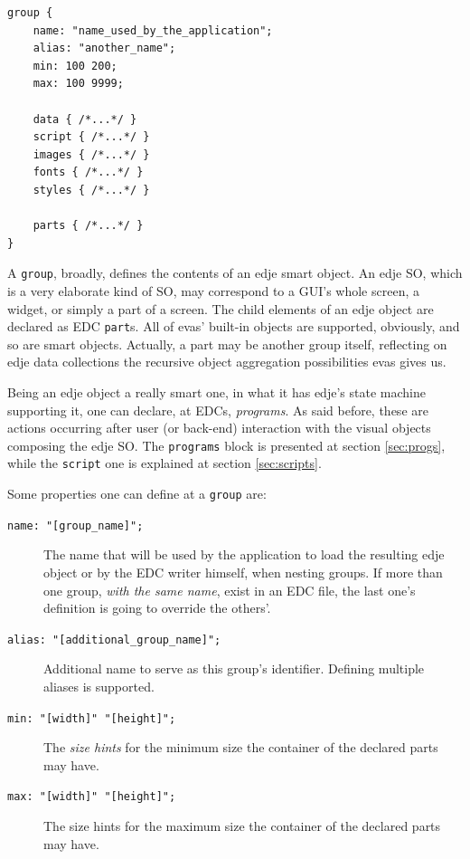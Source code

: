 \documentclass[a4paper]{profusion}
\begin{document}

\begin{lstlisting}
group {
    name: "name_used_by_the_application";
    alias: "another_name";
    min: 100 200;
    max: 100 9999;

    data { /*...*/ }
    script { /*...*/ }
    images { /*...*/ }
    fonts { /*...*/ }
    styles { /*...*/ }

    parts { /*...*/ }
}
\end{lstlisting}

A \texttt{group}, broadly, defines the contents of an edje smart
object.  An edje SO, which is a very elaborate kind of SO, may
correspond to a GUI's whole screen, a widget, or simply a part of a
screen.  The child elements of an edje object are declared as EDC
\texttt{part}s.  All of evas' built-in objects are supported,
obviously, and so are smart objects. Actually, a part may be another
group itself, reflecting on edje data collections the recursive object
aggregation possibilities evas gives us.

Being an edje object a really smart one, in what it has edje's state
machine supporting it, one can declare, at EDCs, \emph{programs}. As
said before, these are actions occurring after user (or back-end)
interaction with the visual objects composing the edje SO. The
\texttt{programs} block is presented at section \ref{sec:progs}, while
the \texttt{script} one is explained at section \ref{sec:scripts}.

Some properties one can define at a \texttt{group} are:

\begin{description}
\item[\texttt{name: "[group\_name]";}] The name that will be used by
  the application to load the resulting edje object or by the EDC
  writer himself, when nesting groups.  If more than one group,
  \emph{with the same name}, exist in an EDC file, the last one's
  definition is going to override the others'.

\item[\texttt{alias: "[additional\_group\_name]";}] Additional name to
  serve as this group's identifier. Defining multiple aliases is
  supported.

\item[\texttt{min: "[width]" "[height]";}] The \emph{size hints} for
  the minimum size the container of the declared parts may have.

\item[\texttt{max: "[width]" "[height]";}] The size hints for the
  maximum size the container of the declared parts may have.
\end{description}
\end{document}
